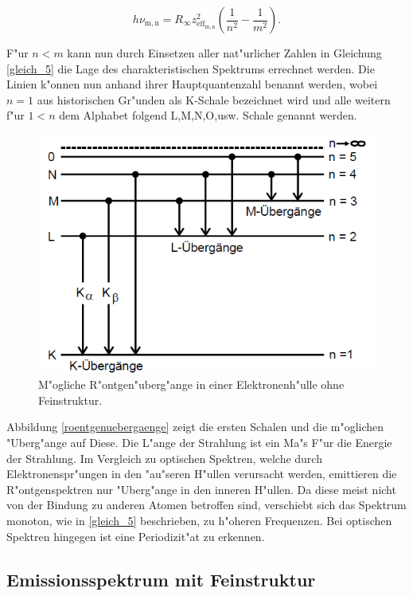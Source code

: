 		\begin{equation}
			h \nu_\mathrm{m,n} = R_\infty z_{\mathrm{eff}_\mathrm{m,n}}^2 \left( \frac{1}{n^2} - \frac{1}{m^2} \right). \label{gleich_5}
		\end{equation}

		F"ur $n < m$ kann nun durch Einsetzen aller nat"urlicher Zahlen in Gleichung \eqref{gleich_5} die Lage des charakteristischen Spektrums errechnet werden.
		Die Linien k"onnen nun anhand ihrer Hauptquantenzahl benannt werden, wobei $n = 1$ aus historischen Gr"unden als K-Schale bezeichnet wird und alle weitern f"ur $1 < n$ dem Alphabet folgend L,M,N,O,usw. Schale genannt werden. 

		\begin{figure}[htbp]
			\centering
			\includegraphics[width = 12cm]{img/Roentgenuebergaenge.png}
			\caption{M"ogliche R"ontgen"uberg"ange in einer Elektronenh"ulle ohne Feinstruktur. \cite{anleitung}}
			\label{roentgenuebergaenge}
		\end{figure}

		Abbildung \eqref{roentgenuebergaenge} zeigt die ersten Schalen und die m"oglichen "Uberg"ange auf Diese. Die L"ange der Strahlung ist ein Ma"s F"ur die Energie der Strahlung.
		Im Vergleich zu optischen Spektren, welche durch Elektronenspr"ungen in den "au"seren H"ullen verursacht werden, emittieren die R"ontgenspektren nur "Uberg"ange in den inneren H"ullen.
		Da diese meist nicht von der Bindung zu anderen Atomen betroffen sind, verschiebt sich das Spektrum monoton, wie in \eqref{gleich_5} beschrieben, zu h"oheren Frequenzen.
		Bei optischen Spektren hingegen ist eine Periodizit"at zu erkennen.

	\subsection{Emissionsspektrum mit Feinstruktur}
	\label{sub:emissionsspektrum_mit_feinstruktur}
	
